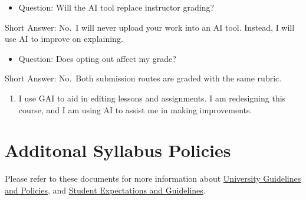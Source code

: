 \documentclass[
  12pt,
]{scrreprt}
\providecommand{\tightlist}{%
  \setlength{\itemsep}{0pt}\setlength{\parskip}{0pt}}
\begin{document}
\begin{itemize}
\tightlist
\item
  Question: Will the AI tool replace instructor grading?
\end{itemize}

Short Answer: No.~I will never upload your work into an AI tool.
Instead, I will use AI to improve on explaining.

\begin{itemize}
\tightlist
\item
  Question: Does opting out affect my grade?
\end{itemize}

Short Answer: No.~Both submission routes are graded with the same
rubric.

\begin{enumerate}
\def\labelenumi{\arabic{enumi}.}
\setcounter{enumi}{1}
\tightlist
\item
  I use GAI to aid in editing lessons and assignments. I am redesigning
  this course, and I am using AI to assist me in making improvements.
\end{enumerate}

\chapter{Additonal Syllabus Policies}\label{additonal-syllabus-policies}

Please refer to these documents for more information about
\href{https://docs.google.com/document/d/14ZMRsHAgo356h0nHtJuStDKGwvg6LY-XOA7PxacwECw/edit?usp=sharing}{University
Guidelines and Policies}, and
\href{https://docs.google.com/document/d/1tO-RnUbkFoQTNhFLzo7HXers2p_3OS4NUFdowagugNw/edit?usp=sharing}{Student
Expectations and Guidelines}.

  
\end{document}

